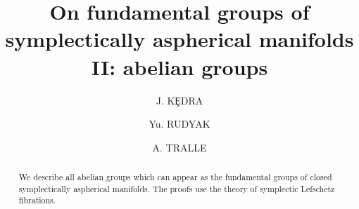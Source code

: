 \documentclass[12pt]{amsart}
\theoremstyle{definition}
\theoremstyle{remark}
\numberwithin{figure}{section}
\numberwithin{table}{section}
\numberwithin{equation}{section}
\begin{document}
 


 


\title[Symplectically aspherical abelian groups]
{On fundamental groups of 
symplectically aspherical manifolds II: abelian groups} 





\author{J. K\c EDRA}
\author{Yu. RUDYAK}
\author{A. TRALLE}





\address{J. K\c edra, Mathematical Sciences, University of Aberdeen,
Meston Building, King's College, Aberdeen AB24 3UE, Scotland, UK\hfill\hfill\newline
{and}\hfill\hfill\newline
Institute of Mathematics, University of Szczecin,
Wielkopolska 15, 70451 Szczecin, Poland}


\address {Yu. Rudyak, Department of Mathematics, University of Florida,
358 Little Hall, Gainesville, FL 32601, USA}


\address{A. Tralle, Department of Mathematics, University of Warmia and 
Mazury,
10561 Olsztyn, Poland}







% 


% 


\begin{abstract}  
We describe all abelian groups which can appear as the 
fundamental groups of closed symplectically aspherical manifolds. 
The proofs use the theory of symplectic Lefschetz fibrations.
\end{abstract} 

\maketitle 


 


 
\end{document}
